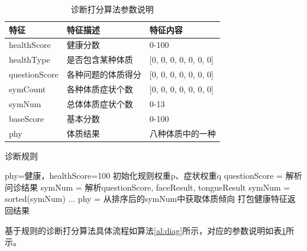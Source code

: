 \begin{table}[h]
    \caption{诊断打分算法参数说明}
    \begin{center}
        \begin{tabular}{lll}
            \toprule
            特征 & 特征描述 & 特征内容 \\ 
            \midrule
            healthScore & 健康分数 & 0-100 \\
            healthType & 是否包含某种体质 & {[}0, 0, 0, 0, 0, 0, 0{]} \\ 
            questionScore & 各种问题的体质得分 & {[}0, 0, 0, 0, 0, 0, 0{]} \\
            symCount & 各种体质症状个数 & {[}0, 0, 0, 0, 0, 0, 0{]} \\
            symNum & 总体体质症状个数 & 0-13 \\
            baseScore & 基本分数 & 0-100 \\
            phy & 体质结果 & 八种体质中的一种\\
            \bottomrule
        \end{tabular}
    \end{center}
    \label{tab:diag-feature}
\end{table}

\begin{algorithm}[htbp]
\caption{诊断规则}%
\label{al:diag}
\LinesNumbered %
phy=健康，healthScore=100\;
初始化规则权重p、症状权重q\;
questionScore = 解析问诊结果\;
symNum = 解析questionScore, faceResult, tongueResult\;
symNum = sorted(symNum)\;
...\;
phy = 从排序后的symNum中获取体质倾向\;
打包健康特征返回结果\;
\end{algorithm}

基于规则的诊断打分算法具体流程如算法\ref{al:diag}所示，对应的参数说明如表\ref{tab:diag-feature}所示。

